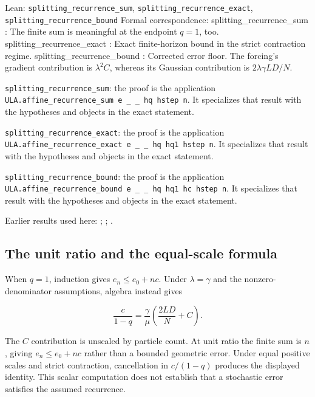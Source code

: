 \documentclass[11pt,a4paper]{report}
\begin{document}
\begin{leanbox}{Lean: \texttt{splitting\_\allowbreak{}recurrence\_\allowbreak{}sum}, \texttt{splitting\_\allowbreak{}recurrence\_\allowbreak{}exact}, \texttt{splitting\_\allowbreak{}recurrence\_\allowbreak{}bound}}
Formal correspondence: splitting\_recurrence\_sum : The finite sum is meaningful at the endpoint \(q=1\), too. splitting\_recurrence\_exact : Exact finite-horizon bound in the strict contraction regime. splitting\_recurrence\_bound : Corrected error floor. The forcing's gradient contribution is \(\lambda^2C\), whereas its Gaussian contribution is \(2\lambda\gamma LD/N\).



\texttt{splitting\_\allowbreak{}recurrence\_\allowbreak{}sum}: the proof is the application \texttt{ULA.\allowbreak{}affine\_\allowbreak{}recurrence\_\allowbreak{}sum e \_\allowbreak{} \_\allowbreak{} hq hstep n}. It specializes that result with the hypotheses and objects in the exact statement.



\texttt{splitting\_\allowbreak{}recurrence\_\allowbreak{}exact}: the proof is the application \texttt{ULA.\allowbreak{}affine\_\allowbreak{}recurrence\_\allowbreak{}exact e \_\allowbreak{} \_\allowbreak{} hq hq1 hstep n}. It specializes that result with the hypotheses and objects in the exact statement.



\texttt{splitting\_\allowbreak{}recurrence\_\allowbreak{}bound}: the proof is the application \texttt{ULA.\allowbreak{}affine\_\allowbreak{}recurrence\_\allowbreak{}bound e \_\allowbreak{} \_\allowbreak{} hq hq1 hc hstep n}. It specializes that result with the hypotheses and objects in the exact statement.
\end{leanbox}


Earlier results used here: \cite[Section~3.15.1]{LangevinLean2026ULASC}; \cite[Section~3.15.2]{LangevinLean2026ULASC}; \cite[Section~3.15.3]{LangevinLean2026ULASC}.
\subsection{\texorpdfstring{The unit ratio and the equal-scale formula}{The unit ratio and the equal-scale formula}}
\label{report-step-ProximalLangevin-Recurrence-lean-3}


When \(q=1\), induction gives \(e_n\le e_0+nc\). Under \(\lambda=\gamma\) and the nonzero-denominator assumptions, algebra instead gives

\[\frac c{1-q}=\frac\gamma\mu\left(\frac{2LD}{N}+C\right).\]

The \(C\) contribution is unscaled by particle count. At unit ratio the finite sum is \(n\), giving \(e_n\le e_0+nc\) rather than a bounded geometric error. Under equal positive scales and strict contraction, cancellation in \(c/(1-q)\) produces the displayed identity. This scalar computation does not establish that a stochastic error satisfies the assumed recurrence.
\end{document}
